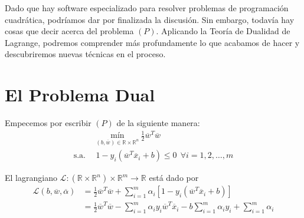 \documentclass[11pt]{article}
\newcommand{\R}{\mathbb{R}}
\newcommand{\Rn}{\R^{n}}
\newcommand{\Rm}{\R^{m}}
\newcommand{\Rnu}{\R\times\Rn}
\newcommand{\av}{\overline{\alpha}}
\newcommand{\wv}{\overline{w}}
\newcommand{\x}{\overline{x}}
\newcommand{\Sm}{1,2,\ldots, m}
\newcommand{\La}{\mathcal{L}}
\newcommand{\ali}{\alpha_{i}}
\begin{document}
Dado que hay software especializado para resolver problemas de programación cuadrática, podríamos dar por finalizada la discusión. Sin embargo, todavía hay cosas que decir acerca del problema $(P)$. Aplicando la Teoría de Dualidad de Lagrange, podremos comprender más profundamente lo que acabamos de hacer y descubriremos nuevas técnicas en el proceso.

\section{El Problema Dual}
Empecemos por escribir $(P)$ de la siguiente manera:
\begin{equation*}
\begin{aligned}
& \underset{(b,\wv)\in \Rnu}{\text{mín}}\ \frac{1}{2}\wv^{T}\wv \\
\text{s.a.}\ \
& 1-y_{i}(\wv^{T}\x_{i}+b)\leq0\ \ \forall i=\Sm
\end{aligned}
\end{equation*}

El lagrangiano $\La:(\Rnu)\times\Rm\rightarrow\R$ está dado por
\begin{equation*}
\begin{aligned}
\La(b, \wv, \av)&=\frac{1}{2}\wv^{T}\wv+\sum_{i=1}^{m}\ali[1-y_{i}(\wv^{T}\x_{i}+b)]\\
&=\frac{1}{2}\wv^{T}\wv-\sum_{i=1}^{m}\ali y_{i}\wv^{T}\x_{i} -b\sum_{i=1}^{m}\ali y_{i}+\sum_{i=1}^{m}\ali
\end{aligned}
\end{equation*}
\end{document}
